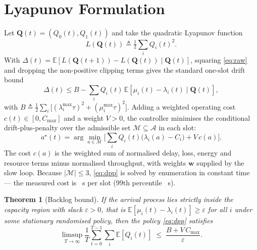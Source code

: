 \documentclass[conference]{IEEEtran}
\newtheorem{theorem}{Theorem}
\newcommand{\Qvec}{\mathbf{Q}}
\newcommand{\wvec}{\mathbf{w}}
\begin{document}
\section{Lyapunov Formulation}\label{sec:theory}

Let $\Qvec(t)=(Q_0(t),Q_1(t))$ and take the quadratic Lyapunov function
\begin{equation}
L(\Qvec(t)) \triangleq \tfrac{1}{2}\textstyle\sum_i Q_i(t)^2 .
\end{equation}
With $\Delta(t)=\mathbb{E}[L(\Qvec(t{+}1))-L(\Qvec(t))\mid\Qvec(t)]$, squaring
\eqref{eq:raw} and dropping the non-positive clipping terms gives the standard
one-slot drift bound
\begin{equation}
\Delta(t) \le B - \sum_i Q_i(t)\,\mathbb{E}\!\left[\mu_i(t)-\lambda_i(t)\mid\Qvec(t)\right],
\label{eq:drift}
\end{equation}
with $B\triangleq\tfrac{1}{2}\sum_i\big[(\lambda_i^{\max}\tau)^2+(\mu_i^{\max}\tau)^2\big]$.
Adding a weighted operating cost $c(t)\in[0,C_{\max}]$ and a weight $V>0$, the
controller minimises the conditional drift-plus-penalty over the admissible set
$\mathcal{M}\subseteq\mathcal{A}$ in each slot:
\begin{equation}
a^{\star}(t) = \arg\min_{a\in\mathcal{M}}
  \Big[\textstyle\sum_i Q_i(t)\big(\lambda_i(a)-C_i\big) + V\,c(a)\Big].
\label{eq:dpp}
\end{equation}
The cost $c(a)$ is the weighted sum of normalised delay, loss, energy and resource
terms minus normalised throughput, with weights $\wvec$ supplied by the slow loop.
Because $|\mathcal{M}|\le3$, \eqref{eq:dpp} is solved by enumeration in constant
time --- the measured cost is \ResFastUs~\textmu s per slot (99th percentile
\ResFastPNinetyNineUs~\textmu s).

\begin{theorem}[Backlog bound]\label{thm:bound}
If the arrival process lies strictly inside the capacity region with slack
$\varepsilon>0$, that is $\mathbb{E}[\mu_i(t)-\lambda_i(t)]\ge\varepsilon$ for all
$i$ under some stationary randomised policy, then the policy \eqref{eq:dpp}
satisfies
\begin{equation}
\limsup_{T\to\infty}\frac{1}{T}\sum_{t=0}^{T-1}\sum_i \mathbb{E}[Q_i(t)]
  \;\le\; \frac{B + V\,C_{\max}}{\varepsilon}.
\label{eq:bound}
\end{equation}
\end{theorem}
\end{document}
